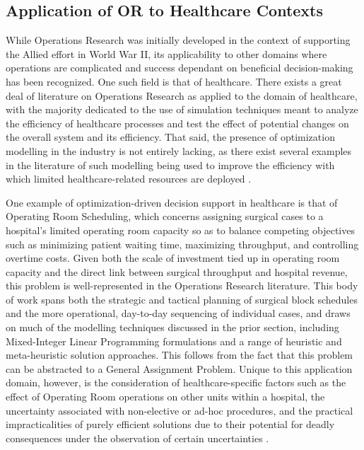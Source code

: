 \documentclass[11pt,twoside]{article}
\numberwithin{Theorem}{section}
\numberwithin{Definition}{section}
\numberwithin{Lemma}{section}
\numberwithin{Algorithm}{section}
\numberwithin{equation}{section}
\begin{document}
\subsection{Application of OR to Healthcare Contexts}

While Operations Research was initially developed in the context of supporting the Allied effort in World War II, its applicability to other domains where operations are complicated and success dependant on beneficial decision-making has been recognized. One such field is that of healthcare. There exists a great deal of literature on Operations Research as applied to the domain of healthcare, with the majority dedicated to the use of simulation techniques meant to analyze the efficiency of healthcare processes and test the effect of potential changes on the overall system and its efficiency. That said, the presence of optimization modelling in the industry is not entirely lacking, as there exist several examples in the literature of such modelling being used to improve the efficiency with which limited healthcare-related resources are deployed \cite{mustafee13}.

One example of optimization-driven decision support in healthcare is that of Operating Room Scheduling, which concerns assigning surgical cases to a hospital's limited operating room capacity so as to balance competing objectives such as minimizing patient waiting time, maximizing throughput, and controlling overtime costs. Given both the scale of investment tied up in operating room capacity and the direct link between surgical throughput and hospital revenue, this problem is well-represented in the Operations Research literature. This body of work spans both the strategic and tactical planning of surgical block schedules and the more operational, day-to-day sequencing of individual cases, and draws on much of the modelling techniques discussed in the prior section, including Mixed-Integer Linear Programming formulations and a range of heuristic and meta-heuristic solution approaches. This follows from the fact that this problem can be abstracted to a General Assignment Problem. Unique to this application domain, however, is the consideration of healthcare-specific factors such as the effect of Operating Room operations on other units within a hospital, the uncertainty associated with non-elective or ad-hoc procedures, and the practical impracticalities of purely efficient solutions due to their potential for deadly consequences under the observation of certain uncertainties \cite{CARDOEN2010}.
\end{document}

